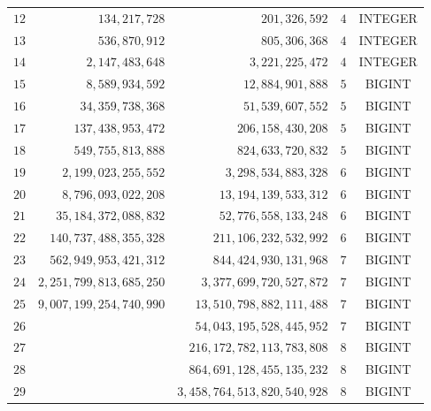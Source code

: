 \documentclass[10pt,titlepage]{article}
\begin{document}
\begin{table}[b!]
\begin{center}
\begin{tabular}{|r|r|r|r|c|}
      $   12 $&$                 134,217,728 $&$                    201,326,592    $&$         4 $&  INTEGER   \\
      $   13 $&$                 536,870,912 $&$                    805,306,368    $&$         4 $&  INTEGER   \\
      $   14 $&$               2,147,483,648 $&$                  3,221,225,472    $&$         4 $&  INTEGER   \\
      $   15 $&$               8,589,934,592 $&$                 12,884,901,888    $&$         5 $&  BIGINT    \\
      $   16 $&$              34,359,738,368 $&$                 51,539,607,552    $&$         5 $&  BIGINT    \\
      $   17 $&$             137,438,953,472 $&$                206,158,430,208    $&$         5 $&  BIGINT    \\
      $   18 $&$             549,755,813,888 $&$                824,633,720,832    $&$         5 $&  BIGINT    \\
      $   19 $&$           2,199,023,255,552 $&$              3,298,534,883,328    $&$         6 $&  BIGINT    \\
      $   20 $&$           8,796,093,022,208 $&$             13,194,139,533,312    $&$         6 $&  BIGINT    \\
      $   21 $&$          35,184,372,088,832 $&$             52,776,558,133,248    $&$         6 $&  BIGINT    \\
      $   22 $&$         140,737,488,355,328 $&$            211,106,232,532,992    $&$         6 $&  BIGINT    \\
      $   23 $&$         562,949,953,421,312 $&$            844,424,930,131,968    $&$         7 $&  BIGINT    \\
      $   24 $&$       2,251,799,813,685,250 $&$          3,377,699,720,527,872    $&$         7 $&  BIGINT    \\
      $   25 $&$       9,007,199,254,740,990 $&$         13,510,798,882,111,488    $&$         7 $&  BIGINT    \\
      $   26 $&$                             $&$         54,043,195,528,445,952    $&$         7 $&  BIGINT    \\
      $   27 $&$                             $&$        216,172,782,113,783,808    $&$         8 $&  BIGINT    \\
      $   28 $&$                             $&$        864,691,128,455,135,232    $&$         8 $&  BIGINT    \\
      $   29 $&$                             $&$      3,458,764,513,820,540,928    $&$         8 $&  BIGINT    \\
      \hline
    \end{tabular}
\end{center} \end{table}
\end{document}
